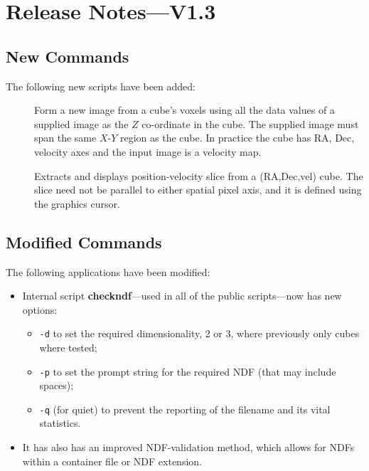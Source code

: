\documentclass[twoside,11pt,nolof]{starlink}
\begin{document}
\section{Release Notes---V1.3\label{se:changes}}

\subsection{New Commands}
The following new scripts have been added:

\begin{description}
   \item [] \mbox{}
     Form a new image from a cube's voxels using all the data
     values of a supplied image as the $Z$ co-ordinate in the cube.
     The supplied image must span the same $X$-$Y$ region as the cube.
     In practice the cube has RA, Dec, velocity axes and the input
     image is a velocity map.

   \item [] \mbox{}
     Extracts and displays position-velocity slice from a
     (RA,Dec,vel) cube.  The slice need not be parallel to either
     spatial pixel axis, and it is defined using the graphics
     cursor.
\end{description}

\subsection{Modified Commands}
The following applications have been modified:

\begin{itemize}

\item Internal script \textbf{checkndf}---used in all of the public
scripts---now has new options:

\begin{itemize}
\item \texttt{-d} to set the required dimensionality, 2 or 3, where
previously only cubes where tested;
\item \texttt{-p} to set the prompt string for the required NDF (that may
include spaces);
\item \texttt{-q} (for quiet) to prevent the reporting of the filename and its
vital statistics.
\end{itemize}

\item It has also has an improved NDF-validation method, which allows for
NDFs within a container file or NDF extension.

\end{itemize}
\end{document}
